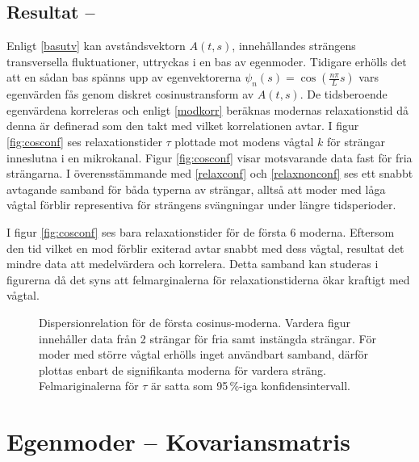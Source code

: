 \subsection{Resultat -- }
Enligt \eqref{basutv} kan avståndsvektorn $A(t,s)$, innehållandes strängens transversella fluktuationer, uttryckas i en bas av egenmoder. Tidigare erhölls det att en sådan bas spänns upp av egenvektorerna $\psi_{n}(s)=\cos({\frac{n\pi}{L}s})$ vars egenvärden fås genom diskret cosinustransform av $A(t,s)$. De tidsberoende egenvärdena korreleras och enligt \eqref{modkorr} beräknas modernas relaxationstid då denna är definerad som den takt med vilket korrelationen avtar. I figur \ref{fig:cosconf} ses relaxationstider $\tau$ plottade mot modens vågtal $k$ för strängar inneslutna i en mikrokanal. Figur \ref{fig:cosconf} visar motsvarande data fast för fria strängarna. I överensstämmande med \eqref{relaxconf} och \eqref{relaxnonconf} ses ett snabbt avtagande samband för båda typerna av strängar, alltså att moder med låga vågtal förblir representiva för strängens svängningar under längre tidsperioder.

I figur \ref{fig:cosconf} ses bara relaxationstider för de första 6 moderna. Eftersom den tid vilket en mod förblir exiterad avtar snabbt med dess vågtal, resultat det mindre data att medelvärdera och korrelera. Detta samband kan studeras i figurerna då det syns att felmarginalerna för relaxationstiderna ökar kraftigt med vågtal.




\begin{figure}
    \centerline{
    \subfigure[][]{
    \label{fig:cosconf}
    }
    \subfigure[][]{
    \label{fig:cosnonconf}
    }}
    \caption{Dispersionrelation för de första cosinus-moderna. Vardera figur innehåller data från 2 strängar för fria samt instängda strängar. För moder med större vågtal erhölls inget användbart samband, därför plottas enbart de signifikanta moderna för vardera sträng. Felmariginalerna för $\tau$ är satta som 95\,\%-iga konfidensintervall.}
\end{figure}


\section{Egenmoder -- Kovariansmatris}


